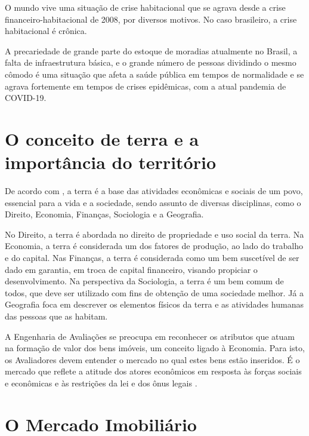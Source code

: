 \documentclass[
	12pt,				%
	oneside,			%
	a4paper,			%
	chapter=TITLE,		%
	section=TITLE,		%
	english,			%
	brazil				%
	]{abntex2}
\begin{document}
O mundo vive uma situação de crise habitacional que se agrava desde a crise
financeiro-habitacional de 2008, por diversos motivos. No caso brasileiro, a
crise habitacional é crônica.

A precariedade de grande parte do estoque de moradias atualmente no Brasil,
a falta de infraestrutura básica, e o grande número de pessoas dividindo o mesmo
cômodo é uma situação que afeta a saúde pública em tempos de normalidade e se
agrava fortemente em tempos de crises epidêmicas, com a atual pandemia de
COVID-19.

\hypertarget{o-conceito-de-terra-e-a-importuxe2ncia-do-territuxf3rio}{%
\section{O conceito de terra e a importância do território}\label{o-conceito-de-terra-e-a-importuxe2ncia-do-territuxf3rio}}

De acordo com \textcite{realestate}, a terra é a base das atividades econômicas e sociais
de um povo, essencial para a vida e a sociedade, sendo assunto de diversas
disciplinas, como o Direito, Economia, Finanças, Sociologia e a Geografia.

No Direito, a terra é abordada no direito de propriedade e uso social da terra.
Na Economia, a terra é considerada um dos fatores de produção, ao lado do
trabalho e do capital. Nas Finanças, a terra é considerada como um bem
suscetível de ser dado em garantia, em troca de capital financeiro, visando
propiciar o desenvolvimento. Na perspectiva da Sociologia, a terra é um bem
comum de todos, que deve ser utilizado com fins de obtenção de uma sociedade
melhor. Já a Geografia foca em descrever os elementos físicos da terra e as
atividades humanas das pessoas que as habitam.

A Engenharia de Avaliações se preocupa em reconhecer os atributos que atuam na
formação de valor dos bens imóveis, um conceito ligado à Economia. Para isto, os
Avaliadores devem entender o mercado no qual estes bens estão inseridos. É o
mercado que reflete a atitude dos atores econômicos em resposta às forças
sociais e econômicas e às restrições da lei e dos ônus legais \autocite[10]{realestate}.

\hypertarget{o-mercado-imobiliuxe1rio}{%
\section{O Mercado Imobiliário}\label{o-mercado-imobiliuxe1rio}}
\end{document}
